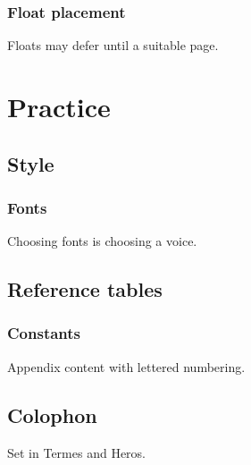 \documentclass[10pt,twoside,openright]{book}
\begin{document}
\section{Float placement}
Floats may defer until a suitable page.

\part{Practice}
\chapter{Style}
\section{Fonts}
Choosing fonts is choosing a voice.

\appendix
\chapter{Reference tables}
\section{Constants}
Appendix content with lettered numbering.
\backmatter
\chapter*{Colophon}
Set in Termes and Heros.
\end{document}
